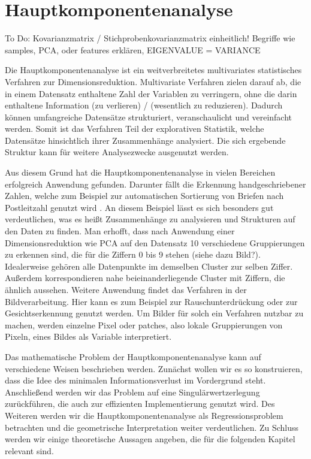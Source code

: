 \chapter{Hauptkomponentenanalyse}

\label{pca}

To Do: Kovarianzmatrix / Stichprobenkovarianzmatrix einheitlich!
Begriffe wie samples, PCA, oder features erklären, EIGENVALUE = VARIANCE

Die Hauptkomponentenanalyse ist ein weitverbreitetes multivariates statistisches Verfahren zur Dimensionsreduktion. Multivariate Verfahren zielen darauf ab, die in einem Datensatz enthaltene Zahl der Variablen zu verringern, ohne die darin enthaltene Information (zu verlieren) / (wesentlich zu reduzieren). Dadurch können umfangreiche Datensätze strukturiert, veranschaulicht und vereinfacht werden. Somit ist das Verfahren Teil der explorativen Statistik, welche Datensätze hinsichtlich ihrer Zusammenhänge analysiert. Die sich ergebende Struktur kann für weitere Analysezwecke ausgenutzt werden.

Aus diesem Grund hat die Hauptkomponentenanalyse in vielen Bereichen erfolgreich Anwendung gefunden. Darunter fällt die Erkennung handgeschriebener Zahlen, welche zum Beispiel zur automatischen Sortierung von Briefen nach Postleitzahl genutzt wird \cite{hastie_elements}. An diesem Beispiel lässt es sich besonders gut verdeutlichen, was es heißt Zusammenhänge zu analysieren und Strukturen auf den Daten zu finden. Man erhofft, dass nach Anwendung einer Dimensionsreduktion wie PCA auf den Datensatz 10 verschiedene Gruppierungen zu erkennen sind, die für die Ziffern 0 bis 9 stehen (siehe dazu Bild?). Idealerweise gehören alle Datenpunkte im demselben Cluster zur selben Ziffer. Außerdem korrespondieren nahe beieinanderliegende Cluster mit Ziffern, die ähnlich aussehen. Weitere Anwendung findet das Verfahren in der Bildverarbeitung. Hier kann es zum Beispiel zur Rauschunterdrückung \cite{babu} oder zur Gesichtserkennung \cite{jiang} genutzt werden. Um Bilder für solch ein Verfahren nutzbar zu machen, werden einzelne Pixel oder patches, also lokale Gruppierungen von Pixeln, eines Bildes als Variable interpretiert.

Das mathematische Problem der Hauptkomponentenanalyse kann auf verschiedene Weisen beschrieben werden. Zunächst wollen wir es so konstruieren, dass die Idee des minimalen Informationsverlust im Vordergrund steht. Anschließend werden wir das Problem auf eine Singulärwertzerlegung zurückführen, die auch zur effizienten Implementierung genutzt wird. Des Weiteren werden wir die Hauptkomponentenanalyse als Regressionsproblem betrachten und die geometrische Interpretation weiter verdeutlichen. Zu Schluss werden wir einige theoretische Aussagen angeben, die für die folgenden Kapitel relevant sind.

